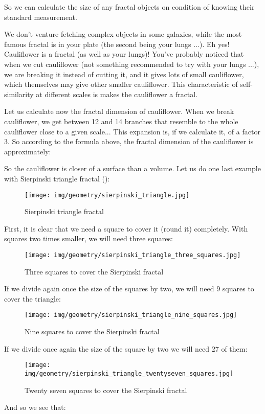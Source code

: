 	So we can calculate the size of any fractal objects on condition of knowing their standard measurement.
	
	We don't venture fetching complex objects in some galaxies, while the most famous fractal is in your plate (the second being your lungs ...). Eh yes! Cauliflower is a fractal (as well as your lungs)! You've probably noticed that when we cut cauliflower (not something recommended to try with your lungs ...), we are breaking it instead of cutting it, and it gives lots of small cauliflower, which themselves may give other smaller cauliflower. This characteristic of self-similarity at different scales is makes the cauliflower a fractal.
	
	Let us calculate now the fractal dimension of cauliflower. When we break cauliflower, we get between 12 and 14 branches that resemble to the whole cauliflower close to a given scale... This expansion is, if we calculate it, of a factor 3. So according to the formula above, the fractal dimension of the cauliflower is approximately:
	
	So the cauliflower is closer of a surface than a volume.
	Let us do one last example with Sierpinski triangle fractal ():
	\begin{figure}[H]
		\centering
		\texttt{[image: img/geometry/sierpinski\_triangle.jpg]}
		\caption{Sierpinski triangle fractal}
	\end{figure}
	First, it is clear that we need a square to cover it (round it) completely. With squares two times smaller, we will need three squares:
	\begin{figure}[H]
		\centering
		\texttt{[image: img/geometry/sierpinski\_triangle\_three\_squares.jpg]}
		\caption{Three squares to cover the Sierpinski fractal}
	\end{figure}
	If we divide again once the size of the squares by two, we will need $9$ squares to cover the triangle:
	\begin{figure}[H]
		\centering
		\texttt{[image: img/geometry/sierpinski\_triangle\_nine\_squares.jpg]}
		\caption{Nine squares to cover the Sierpinski fractal}
	\end{figure}
	If we divide once again the size of the square by two we will need $27$ of them:
	\begin{figure}[H]
		\centering
		\texttt{[image: img/geometry/sierpinski\_triangle\_twentyseven\_squares.jpg]}
		\caption{Twenty seven squares to cover the Sierpinski fractal}
	\end{figure}
	And so we see that:
	
